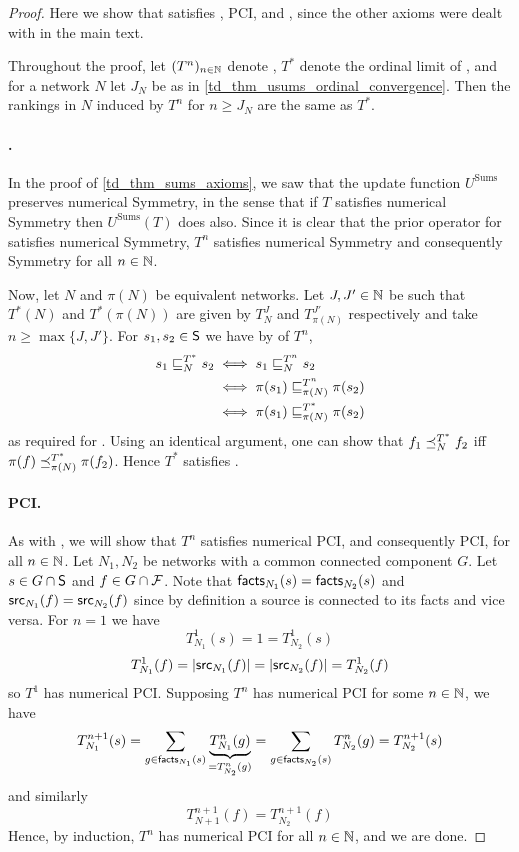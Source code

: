 \begin{proof}

    Here we show that \usums{} satisfies \symmetry{}, PCI, \unanimity{} and
    \groundedness{},
since the other axioms were dealt with in the main text.

Throughout the proof, let $(T^n)_{n \in \Nat}$ denote \usums{}, $T^*$ denote
the ordinal limit of \usums{}, and for a network $N$ let $J_N$ be as in
\cref{td_thm_usums_ordinal_convergence}. Then the rankings in $N$ induced by $T^n$
for $n \ge J_N$ are the same as $T^*$.

    \paragraph{\symmetry{}.} In the proof of \cref{td_thm_sums_axioms}, we saw
that the update function $U^{\text{Sums}}$ preserves numerical Symmetry, in the
sense that if $T$ satisfies numerical Symmetry then $U^{\text{Sums}}(T)$ does
also. Since it is clear that the prior operator for \usums{} satisfies
numerical Symmetry, $T^n$ satisfies numerical Symmetry and consequently
Symmetry for all $n \in \Nat$.

Now, let $N$ and $\pi(N)$ be equivalent networks. Let $J, J' \in \Nat$ be
such that $T^*(N)$ and $T^*(\pi(N))$ are given by $T_N^J$ and
$T_{\pi(N)}^{J'}$ respectively and take $n \ge \max\{J, J'\}$. For $s_1, s_2
    \in \S$ we have by \symmetry{} of $T^n$,
\begin{align*}
    s_1 \sle_N^{T^*} s_2
    & \iff s_1 \sle_N^{T^n} s_2 \\
    & \iff \pi(s_1) \sle_{\pi(N)}^{T^n} \pi(s_2) \\
    & \iff \pi(s_1) \sle_{\pi(N)}^{T^*} \pi(s_2)
\end{align*}
    as required for \symmetry{}. Using an identical argument, one can show that $f_1
\fle_N^{T^*} f_2$ iff $\pi(f) \fle_{\pi(N)}^{T^*} \pi(f_2)$. Hence $T^*$
    satisfies \symmetry{}.

\paragraph{PCI.}
    As with \symmetry{}, we will show that $T^n$ satisfies numerical
PCI, and consequently PCI, for all $n \in \Nat$. Let $N_1,
N_2$ be networks with a common connected component $G$. Let $s \in G \cap \S$
and $f \in G \cap \F$. Note that $\facts_{N_1}(s) = \facts_{N_2}(s)$ and
$\src_{N_1}(f) = \src_{N_2}(f)$ since by definition a source is connected to
its facts and vice versa. For $n = 1$ we have
\[
    T_{N_1}^1(s) = 1 = T_{N_2}^1(s)
\]
\[
    T_{N_1}^1(f) = |\src_{N_1}(f)| = |\src_{N_2}(f)| = T_{N_2}^1(f)
\]
so $T^1$ has numerical PCI. Supposing $T^n$ has numerical PCI for some $n \in
\Nat$, we have
\[
    T_{N_1}^{n+1}(s)
    = \sum_{g \in \facts_{N_1}(s)}{
        \underbrace{T_{N_1}^n(g)}_{=T_{N_2}^n(g)}
    }
    = \sum_{g \in \facts_{N_2}(s)}{
        T_{N_2}^n(g)
    }
    = T_{N_2}^{n+1}(s)
\]
and similarly
\[
    T_{N+1}^{n+1}(f) = T_{N_2}^{n+1}(f)
\]
Hence, by induction, $T^n$ has numerical PCI for all $n \in \Nat$, and we are
done.


\end{proof}
